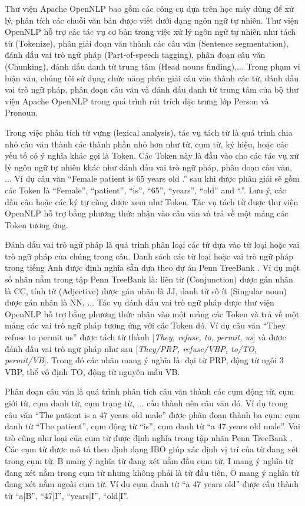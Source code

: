 Thư viện Apache OpenNLP bao gồm các công cụ dựa trên học máy dùng để xử lý, phân tích các chuỗi văn bản được viết dưới dạng ngôn ngữ tự nhiên. Thư viện OpenNLP hỗ trợ các tác vụ cơ bản trong việc xử lý ngôn ngữ tự nhiên như tách từ (Tokenize), phân giải đoạn văn thành các câu văn (Sentence segmentation), đánh dấu vai trò ngữ pháp (Part-of-speech tagging), phân đoạn câu văn (Chunking), đánh dấu danh từ trung tâm (Head nouns finding),... Trong phạm vi luận văn, chúng tôi sử dụng chức năng phân giải câu văn thành các từ, đánh dấu vai trò ngữ pháp, phân đoạn câu văn và đánh dấu danh từ trung tâm của bộ thư viện Apache OpenNLP trong quá trình rút trích đặc trưng lớp Person và Pronoun.

Trong việc phân tích từ vựng (lexical analysis), tác vụ tách từ là quá trình chia nhỏ câu văn thành các thành phần nhỏ hơn như từ, cụm từ, ký hiệu, hoặc các yếu tố có ý nghĩa khác gọi là Token. Các Token này là đầu vào cho các tác vụ xử lý ngôn ngữ tự nhiên khác như đánh dấu vai trò ngữ pháp, phân đoạn câu văn, ... Ví dụ câu văn ``Female patient is 65 years old .'' sau khi được phân giải sẽ gồm các Token là ``Female'', ``patient'', ``is'', ``65'', ``years'', ``old'' and ``.''. Lưu ý, các dấu câu hoặc các ký tự cũng được xem như Token. Tác vụ tách từ được thư viện OpenNLP hỗ trợ bằng phương thức nhận vào câu văn và trả về một mảng các Token tương ứng.

Đánh dấu vai trò ngữ pháp là quá trình phân loại các từ dựa vào từ loại hoặc vai trò ngữ pháp của chúng trong câu. Danh sách các từ loại hoặc vai trò ngữ pháp trong tiếng Anh được định nghĩa sẵn dựa theo dự án Penn TreeBank \cite{Santorini1990}. Ví dụ một số nhãn nằm trong tập Penn TreeBank là: liên từ (Conjunction) được gán nhãn là CC, tính từ (Adjective) được gán nhãn là JJ, danh từ số ít (Singular noun) được gán nhãn là NN, ... Tác vụ đánh dấu vai trò ngữ pháp được thư viện OpenNLP hỗ trợ bằng phương thức nhận vào một mảng các Token và trả về một mảng các vai trò ngữ pháp tương ứng với các Token đó. Ví dụ câu văn ``They refuse to permit us'' được tách từ thành [\textit{They, refuse, to, permit, us}] và được đánh dấu vai trò ngữ pháp như sau [\textit{They/PRP, refuse/VBP, to/TO, permit/VB}]. Trong đó các nhãn mang ý nghĩa là: đại từ PRP, động từ ngôi 3 VBP, thể vô định TO, động từ nguyên mẫu VB.

Phân đoạn câu văn là quá trình phân tích câu văn thành các cụm động từ, cụm giới từ, cụm danh từ, cụm trạng từ, ... cấu thành nên câu văn đó. Ví dụ trong câu văn ``The patient is a 47 years old male'' được phân đoạn thành ba cụm: cụm danh từ ``The patient'', cụm động từ ``is'', cụm danh từ ``a 47 years old male''. Vai trò cũng như loại của cụm từ được định nghĩa trong tập nhãn Penn TreeBank \cite{Santorini1990}. Các cụm từ được mô tả theo định dạng IBO giúp xác định vị trí của từ  đang xét trong cụm từ. B mang ý nghĩa từ đang xét nằm đầu cụm từ, I mang ý nghĩa từ đang xét nằm trong cụm từ nhưng không phải là từ đầu tiên, O mang ý nghĩa từ đang xét nằm ngoài cụm từ. Ví dụ cụm danh từ ``a 47 years old'' được cấu thành từ ``a|B'', ``47|I'', ``years|I'', ``old|I''.

